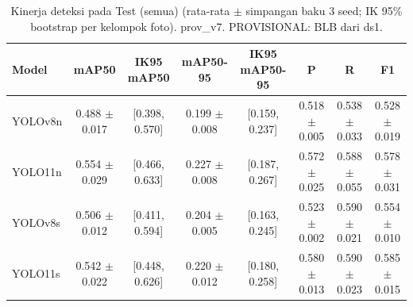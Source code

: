 \begin{table}[!t]
\centering
\caption{Kinerja deteksi pada Test (semua) (rata-rata $\pm$ simpangan baku 3 seed; IK 95\% bootstrap per kelompok foto). prov\_v7. PROVISIONAL: BLB dari ds1.}
\label{tab:utama_test_dengan_background}
\footnotesize
\begin{tabular}{lccccccc}
\hline
\textbf{Model} & \textbf{mAP50} & \textbf{IK95 mAP50} & \textbf{mAP50-95} & \textbf{IK95 mAP50-95} & \textbf{P} & \textbf{R} & \textbf{F1} \\
\hline
YOLOv8n & 0.488 $\pm$ 0.017 & [0.398, 0.570] & 0.199 $\pm$ 0.008 & [0.159, 0.237] & 0.518 $\pm$ 0.005 & 0.538 $\pm$ 0.033 & 0.528 $\pm$ 0.019 \\
YOLO11n & 0.554 $\pm$ 0.029 & [0.466, 0.633] & 0.227 $\pm$ 0.008 & [0.187, 0.267] & 0.572 $\pm$ 0.025 & 0.588 $\pm$ 0.055 & 0.578 $\pm$ 0.031 \\
YOLOv8s & 0.506 $\pm$ 0.012 & [0.411, 0.594] & 0.204 $\pm$ 0.005 & [0.163, 0.245] & 0.523 $\pm$ 0.002 & 0.590 $\pm$ 0.021 & 0.554 $\pm$ 0.010 \\
YOLO11s & 0.542 $\pm$ 0.022 & [0.448, 0.626] & 0.220 $\pm$ 0.012 & [0.180, 0.258] & 0.580 $\pm$ 0.013 & 0.590 $\pm$ 0.023 & 0.585 $\pm$ 0.015 \\
\hline
\end{tabular}
\end{table}
